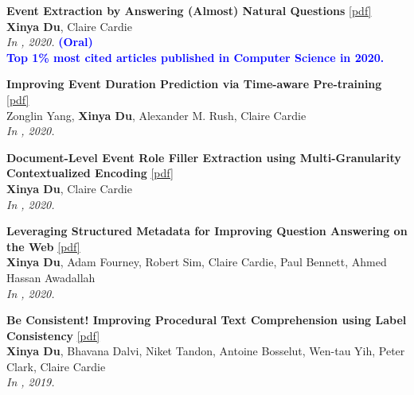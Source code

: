 \begin{enumerate}[{[}1{]},leftmargin=*]
\item
{\bf Event Extraction by Answering (Almost) Natural Questions}
\href{https://aclanthology.org/2020.emnlp-main.49.pdf}{{[pdf]}} \\
{\textbf{Xinya Du}, Claire Cardie} \\
{\it In \EMNLP, 2020.} {\textcolor{blue}{\textbf{(Oral)}}} \\
{\textcolor{blue}{\textbf{Top 1\% most cited articles published in Computer Science in 2020.}}} \\

\item
{\bf Improving Event Duration Prediction via Time-aware Pre-training}
\href{https://aclanthology.org/2020.findings-emnlp.302.pdf}{{[pdf]}} \\
{Zonglin Yang, \textbf{Xinya Du}, Alexander M. Rush, Claire Cardie} \\
{\it In \EMNLPfinding, 2020.}\\

\parbox{\textwidth}{
\item
{\bf Document-Level Event Role Filler Extraction using Multi-Granularity Contextualized Encoding}
\href{https://aclanthology.org/2020.acl-main.714.pdf}{{[pdf]}} \\
{\textbf{Xinya Du}, Claire Cardie} \\
{\it In \ACL, 2020.}\\
}

\parbox{\textwidth}{
\item
{\bf Leveraging Structured Metadata for Improving Question Answering on the Web}
\href{https://aclanthology.org/2020.aacl-main.55.pdf}{{[pdf]}} \\
{\textbf{Xinya Du}, Adam Fourney, Robert Sim, Claire Cardie, Paul Bennett, Ahmed Hassan Awadallah} \\
{\it In \AACL, 2020.}\\
}

\parbox{\textwidth}{
\item
{\bf Be Consistent! Improving Procedural Text Comprehension using Label Consistency}
\href{https://aclanthology.org/N19-1244.pdf}{{[pdf]}} \\
{\textbf{Xinya Du}, Bhavana Dalvi, Niket Tandon, Antoine Bosselut, Wen-tau Yih, Peter Clark, Claire Cardie} \\
{\it In \NAACL, 2019.}\\
}


\end{enumerate}
